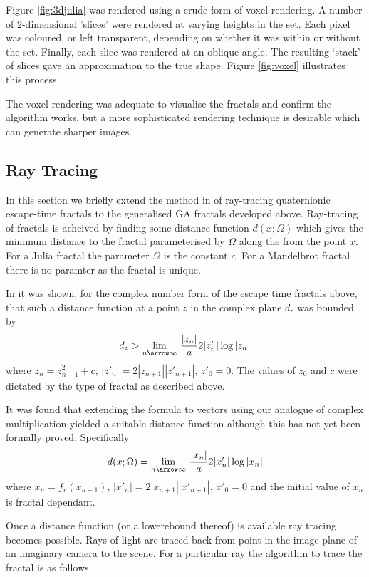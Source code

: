 Figure \ref{fig:3djulia} was rendered using a crude form of voxel rendering. A
number of 2-dimensional 'slices' were rendered at varying heights in the set. Each
pixel was coloured, or left transparent, depending on whether it was within or without
the set. Finally, each slice was rendered at an oblique angle. The resulting
`stack' of slices gave an approximation to the true shape. Figure
\ref{fig:voxel} illustrates this process.

The voxel rendering was adequate to visualise the fractals and confirm the algorithm
works, but a more sophisticated rendering technique is desirable which can generate
sharper images.

\subsection{Ray Tracing}

In this section we briefly extend the method in \cite{FRAC:HypercomplexIterations} of 
ray-tracing quaternionic escape-time fractals to the generalised GA fractals developed 
above. Ray-tracing of fractals is acheived by finding some distance function
$d(x;\Omega)$ which gives the minimum distance to the fractal parameterised by
$\Omega$ along the from the point $x$. For a Julia fractal the
parameter $\Omega$ is the constant $c$. For a Mandelbrot fractal there is no
paramter as the fractal is unique. 

In \cite{FRAC:HypercomplexIterations} it was shown, for the complex number
form of the escape time fractals above, that such a distance function
at a point $z$ in the complex plane $d_z$ was bounded by
\[
d_z > \lim_{n \arrow \infty}\,\frac{|z_n|}a{2|z'_n|}\log|z_n|
\]
where $z_n = z_{n-1}^2 + c$, $|z'_n| = 2|z_{n+1}||z'_{n+1}|$, $z'_0 = 0$.
The values of $z_0$ and $c$ were dictated by the type of fractal as described above.

It was found that extending the formula to vectors using our analogue of
complex multiplication yielded a suitable distance function although this has not
yet been formally proved. Specifically
\[
d(x; \Omega) = \lim_{n \arrow \infty}\,\frac{|x_n|}a{2|x'_n|}\log|x_n|
\]
where $x_n = f_v(x_{n-1})$, $|x'_n| = 2|x_{n+1}||x'_{n+1}|$, $x'_0 = 0$ and
the initial value of $x_n$ is fractal dependant. 

Once a distance function (or a lowerebound thereof) is available ray tracing
becomes possible. Rays of light are traced back from point in the image
plane of an imaginary camera to the scene. For a particular ray the algorithm
to trace the fractal is as follows.

